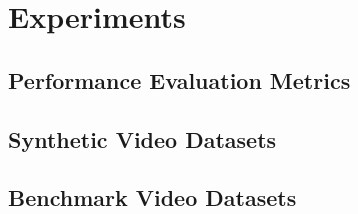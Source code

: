 \documentclass[twocolumn, final]{svjour3}
\begin{document}




\section{Experiments}
\label{sec:experiments}


\subsection{Performance Evaluation Metrics}
\label{sec:performanceevaluationmetrics}


\subsection{Synthetic Video Datasets}
\label{sec:syntheticvideodatasets}


\subsection{Benchmark Video Datasets}
\label{sec:benchmarkvideodatasets}
\end{document}
